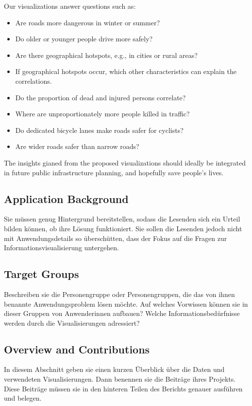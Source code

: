 \documentclass[usegeometry=true]{scrartcl}
\begin{document}
Our visualizations answer questions such as:
\begin{itemize}
    \item Are roads more dangerous in winter or summer?
    \item Do older or younger people drive more safely?
    \item Are there geographical hotspots, e.g., in cities or rural areas?
    \item If geographical hotspots occur, which other characteristics can explain the correlations.
    \item Do the proportion of dead and injured persons correlate?
    \item Where are unproportionately more people killed in traffic?
    \item Do dedicated bicycle lanes make roads safer for cyclists?
    \item Are wider roads safer than narrow roads?
\end{itemize}
The insights gianed from the proposed visualizations should ideally be integrated in future public infrastructure planning, and hopefully save people's lives.

\subsection{Application Background}
Sie müssen genug Hintergrund bereitstellen, sodass die Lesenden sich ein Urteil bilden können, ob ihre Lösung funktioniert. Sie sollen die Lesenden jedoch nicht mit Anwendungsdetails so überschütten, dass der Fokus auf die Fragen zur Informationsvisualisierung untergehen.
\subsection{Target Groups}
Beschreiben sie die Personengruppe oder Personengruppen, die das von ihnen benannte Anwendungsproblem lösen möchte. Auf welches Vorwissen können sie in dieser Gruppen von Anwenderinnen aufbauen? Welche Informationsbedürfnisse werden durch die Visualisierungen adressiert?
\subsection{Overview and Contributions}
In diesem Abschnitt geben sie einen kurzen Überblick über die Daten und verwendeten Visualisierungen. Dann benennen sie die Beiträge ihres Projekts. Diese Beiträge müssen sie in den hinteren Teilen des Berichts genauer ausführen und belegen.
\end{document}
